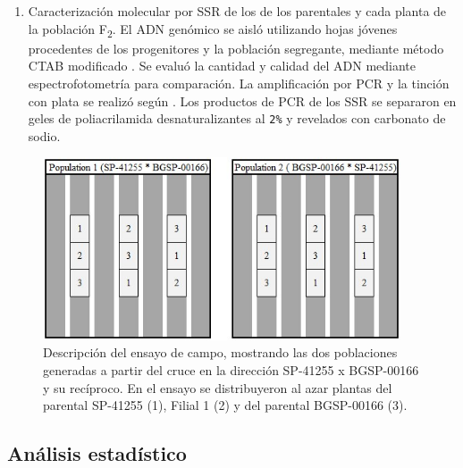 \documentclass[12pt,oneside]{reedthesis}
\begin{document}
\begin{enumerate}
\item
  Caracterización molecular por SSR de los de los parentales y cada planta de la población F\textsubscript{2}. El ADN genómico se aisló utilizando hojas jóvenes procedentes de los progenitores y la población segregante, mediante método CTAB modificado \autocite{zhang2000,paterson1993}. Se evaluó la cantidad y calidad del ADN mediante espectrofotometría para comparación. La amplificación por PCR y la tinción con plata se realizó según \textcite{lin2005} . Los productos de PCR de los SSR se separaron en geles de poliacrilamida desnaturalizantes al \texttt{2\%} y revelados con carbonato de sodio\autocite{lin2005}.
\end{enumerate}

\begin{figure}
\includegraphics[width=400px]{figure/chap3/croquis_campo} \caption{Descripción del ensayo de campo, mostrando las dos poblaciones generadas a partir del cruce en la dirección SP-41255 x BGSP-00166 y su recíproco. En el ensayo se distribuyeron al azar plantas del parental SP-41255 (1), Filial 1 (2) y del parental BGSP-00166 (3).}\label{fig:img-croquis}
\end{figure}

\subsection{Análisis estadístico}\label{anuxe1lisis-estaduxedstico-1}
\end{document}
